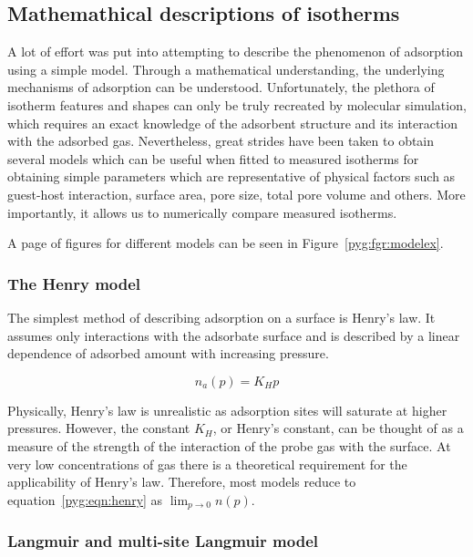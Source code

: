 \subsection{Mathemathical descriptions of isotherms}

A lot of effort was put into attempting to describe
the phenomenon of adsorption using a simple model.
Through a mathematical understanding, the underlying
mechanisms of adsorption can be understood.
Unfortunately, the plethora of isotherm
features and shapes can only be truly recreated
by molecular simulation, which requires an exact
knowledge of the adsorbent structure and its interaction
with the adsorbed gas.
Nevertheless, great strides have been taken to
obtain several models which can be useful
when fitted to measured isotherms
for obtaining simple parameters which are
representative of physical factors such as
guest-host interaction, surface area, pore size,
total pore volume and others.
More importantly, it allows us to numerically
compare measured isotherms.

A page of figures for different models can be seen in
Figure~\ref{pyg:fgr:modelex}.

\subsubsection{The Henry model}\label{pyg:models:henry}

The simplest method of describing adsorption on a
surface is Henry’s law. It assumes only interactions
with the adsorbate surface and is described by a
linear dependence of adsorbed amount with
increasing pressure.

\begin{equation}\label{pyg:eqn:henry}
	n_a(p) = K_H p
\end{equation}

Physically, Henry's law is unrealistic as adsorption sites
will saturate at higher pressures. However, the constant \(K_H\),
or Henry’s constant, can be thought of as a measure of the strength
of the interaction of the probe gas with the surface. At very
low concentrations of gas there is a
theoretical requirement for the applicability of Henry's law.
Therefore, most models reduce to equation~\ref{pyg:eqn:henry}
as \(\lim_{p \to 0} n(p)\).

\subsubsection{Langmuir and multi-site Langmuir
	model}\label{pyg:models:langmuir}

